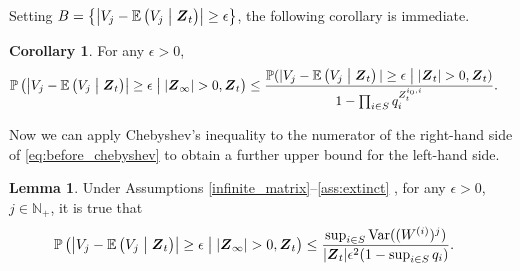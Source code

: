 \documentclass[preprint,3p,12pt]{elsarticle}
\theoremstyle{definition}
\newtheorem{lemma}{Lemma}
\newtheorem{corollary}{Corollary}[theorem]
\newcommand{\Var}{\operatorname{Var}}
\newcommand{\z}[1][i_0, i]{Z_t^{#1}}
\newcommand{\V}[1]{V_{#1}}
\newcommand{\assumptionsHS}{%
 \ref{infinite_matrix}--\ref{ass:extinct}
}
\begin{document}
Setting %
$B=\left\{\left|\V{j}-\mathbb{E}\left(\V{j}\bigm|  \boldsymbol{Z}_t\right)\right| \ge\epsilon\right\}$, the following corollary is immediate.
\begin{corollary}
For any $\epsilon > 0$,
      \begin{align}
    \mathbb{P} \left(\left|\V{j}-\mathbb{E}\left(\V{j}\bigm|  \boldsymbol{Z}_t\right) \right|\ge\epsilon\bigm\vert |\boldsymbol{Z}_{\infty}| > 0, \boldsymbol{Z}_t\right) %
         &\le \frac{\mathbb{P}(|\V{j}-\mathbb{E}\left(\V{j}\bigm|  \boldsymbol{Z}_t\right) |\ge\epsilon\bigm||\boldsymbol{Z}_{t}| > 0, \boldsymbol{Z}_t)}
    {1 - \prod_{i \in S}q_i^{\z}}.\label{eq:before_chebyshev}
    \end{align}
\end{corollary}
Now we can apply Chebyshev's inequality to the numerator of the right-hand side of \eqref{eq:before_chebyshev} to obtain a further upper bound for the left-hand side. 
\begin{lemma}\label{chebyshev}
    Under Assumptions \assumptionsHS, for any $\epsilon > 0$, $j \in \mathbb{N}_+$, it is true that
    \begin{align*}
    \mathbb{P}\left(\left|\V{j}- \mathbb{E}\left(\V{j}\bigm|  \boldsymbol{Z}_t\right) \right|\ge\epsilon \bigm| | \boldsymbol{Z}_{\infty}| > 0, \boldsymbol{Z}_t\right) %
    & \le \frac{\sup_{i \in S}{\Var((W^{(i)})^j)}}{|\boldsymbol{Z}_t| \epsilon^2(1 - \sup_{i \in S}q_i)}.
\end{align*}
\end{lemma}
\end{document}
